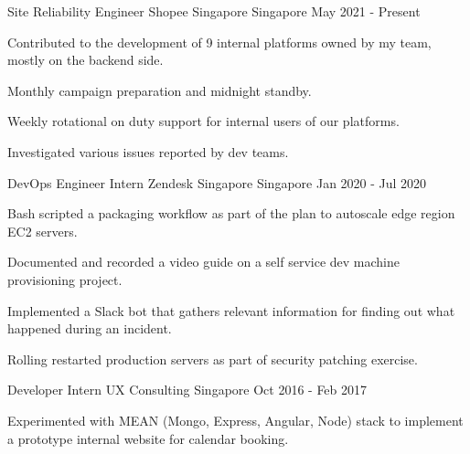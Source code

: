 

\begin{cventries}

  \cventry
    {Site Reliability Engineer} %
    {Shopee Singapore} %
    {Singapore} %
    {May 2021 - Present} %
    {
      \begin{cvitems} %
        \item {Contributed to the development of 9 internal platforms owned by my team, mostly on the backend side.}
        \item {Monthly campaign preparation and midnight standby.}
        \item {Weekly rotational on duty support for internal users of our platforms.}
        \item {Investigated various issues reported by dev teams.}
      \end{cvitems}
    }

  \cventry
    {DevOps Engineer Intern} %
    {Zendesk Singapore} %
    {Singapore} %
    {Jan 2020 - Jul 2020} %
    {
      \begin{cvitems} %
        \item {Bash scripted a packaging workflow as part of the plan to autoscale edge region EC2 servers.}
        \item {Documented and recorded a video guide on a self service dev machine provisioning project.}
        \item {Implemented a Slack bot that gathers relevant information for finding out what happened during an incident.}
        \item {Rolling restarted production servers as part of security patching exercise.}
      \end{cvitems}
    }

  \cventry
    {Developer Intern} %
    {UX Consulting} %
    {Singapore} %
    {Oct 2016 - Feb 2017} %
    {
      \begin{cvitems} %
        \item {Experimented with MEAN (Mongo, Express, Angular, Node) stack to implement a prototype internal website for calendar booking.}
      \end{cvitems}
    }

\end{cventries}
